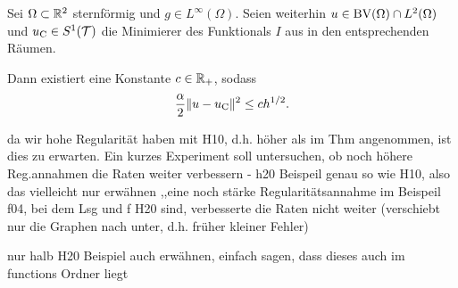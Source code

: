   \begin{theorem}
    \label{thm:errorEstimateCourant}
    Sei $\Omega\subset\mathbb{R}^2$ sternförmig und $g\in L^\infty(\Omega)$.  Seien
    weiterhin $u\in\textup{BV}(\Omega)\cap L^2(\Omega)$ und $u_{\textup{C}}\in S^1(\mathcal{T})$ die
    Minimierer des Funktionals $I$ aus  in den entsprechenden
    Räumen.
  
    Dann existiert eine Konstante $c\in\mathbb{R}_+$, sodass
    \begin{align*}
      \frac{\alpha}{2}\Vert u-u_{\textup{C}}\Vert^2\leq
      ch^{1/2}.
    \end{align*}
  \end{theorem}

  da wir hohe Regularität haben mit H10, d.h. höher als im Thm angenommen, ist
  dies zu erwarten. Ein kurzes Experiment soll untersuchen, ob noch höhere 
  Reg.annahmen die Raten weiter verbessern
  - h20 Beispeil genau so wie H10, also das vielleicht nur erwähnen ,,eine 
    noch stärke Regularitätsannahme im Beispeil f04, bei dem Lsg und f H20 sind,
    verbesserte die Raten nicht weiter (verschiebt nur die Graphen nach unter,
    d.h. früher kleiner Fehler)

  nur halb H20 Beispiel auch erwähnen, einfach sagen, dass dieses auch im 
  functions Ordner liegt


